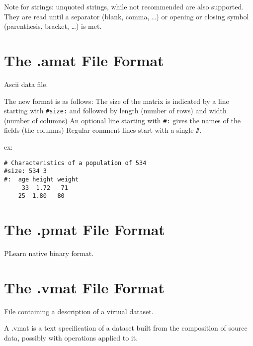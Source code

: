 \documentclass[11pt]{book}
\begin{document}
Note for strings: unquoted strings, while not recommended are also supported. They are read until
a separator (blank, comma, \ldots) or opening or closing symbol (parenthesis, bracket, \ldots) is met.


\section{The .amat File Format}

Ascii data file.

The new format is as follows:
The size of the matrix is indicated by a line starting with \verb!#size:! and followed by length (number of rows) and width (number of columns)
An optional line starting with \verb!#:! gives the names of the fields (the columns)
Regular comment lines start with a single \verb!#!.

ex:

\begin{verbatim}
# Characteristics of a population of 534
#size: 534 3
#:  age height weight
     33  1.72   71
    25  1.80   80
\end{verbatim}

\section{The .pmat File Format}

PLearn native binary format.

\section{The .vmat File Format}

File containing a description of a virtual dataset.

A .vmat is a text specification of a dataset built from the composition of source data, possibly with operations applied to it.

 


% 
\end{document}
